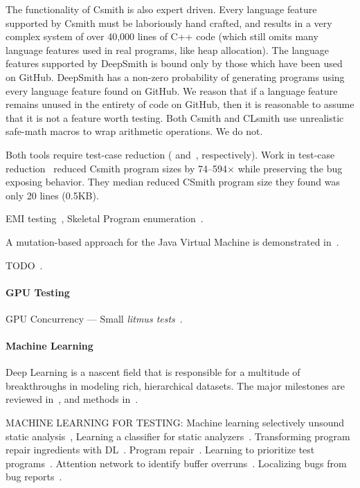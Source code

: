The functionality of Csmith is also expert driven. Every language feature supported by Csmith must be laboriously hand crafted, and results in a very complex system of over 40,000 lines of C++ code (which still omits many language features used in real programs, like heap allocation). The language features supported by DeepSmith is bound only by those which have been used on GitHub. DeepSmith has a non-zero probability of generating programs using every language feature found on GitHub. We reason that if a language feature remains unused in the entirety of code on GitHub, then it is reasonable to assume that it is not a feature worth testing. Both Csmith and CLsmith use unrealistic safe-math macros to wrap arithmetic operations. We do not.

Both tools require test-case reduction (\cite{Regehr2012a} and~\cite{Pflanzer2016}, respectively). Work in test-case reduction~\cite{Regehr2012a} reduced Csmith program sizes by 74--594$\times$ while preserving the bug exposing behavior. They median reduced CSmith program size they found was only 20 lines (0.5KB).


EMI testing~\cite{Le2013a}, Skeletal Program enumeration~\cite{Zhang2017a}.

A mutation-based approach for the Java Virtual Machine is demonstrated in~\cite{Chena}.

TODO~\cite{White2016}.

\paragraph{GPU Testing} GPU Concurrency --- Small \emph{litmus tests}~\cite{Alglave2015}.


\paragraph{Machine Learning} Deep Learning is a nascent field that is responsible for a multitude of breakthroughs in modeling rich, hierarchical datasets. The major milestones are reviewed in~\cite{Wang2017}, and methods in~\cite{Schmidhuber2014}.

MACHINE LEARNING FOR TESTING: Machine learning selectively unsound static analysis~\cite{Heo2017}, Learning a classifier for static analyzers~\cite{Koc2017}.
Transforming program repair ingredients with DL~\cite{White}. Program repair~\cite{Koukoutos2017a}. Learning to prioritize test programs~\cite{Chen2017}. Attention network to identify buffer overruns~\cite{Choi2016}. Localizing bugs from bug reports~\cite{Lam2016,Huo2016}.

